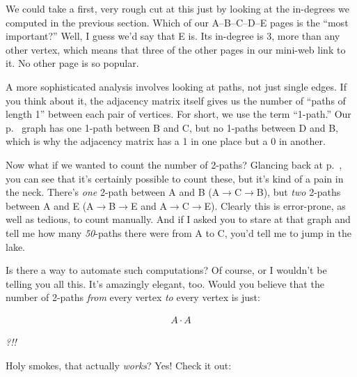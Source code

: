 \begin{alttitles}
We could take a first, very rough cut at this just by looking at the in-degrees
we computed in the previous section. Which of our A--B--C--D--E pages is the
``most important?'' Well, I guess we'd say that E is. Its in-degree is 3, more
than any other vertex, which means that three of the other pages in our
mini-web link to it. No other page is so popular.


A more sophisticated analysis involves looking at paths, not just single edges.
If you think about it, the adjacency matrix itself gives us the number of
``paths of length 1'' between each pair of vertices. For short, we use the term
``1-path.'' Our p.~\pageref{fig:directedGraph} graph has one 1-path between B
and C, but no 1-paths between D and B, which is why the adjacency matrix has a
1 in one place but a 0 in another.

Now what if we wanted to count the number of 2-paths? Glancing back at
p.~\pageref{fig:directedGraph}, you can see that it's certainly possible to
count these, but it's kind of a pain in the neck. There's \textit{one} 2-path
between A and B (A$\rightarrow$C$\rightarrow$B), but \textit{two} 2-paths
between A and E (A$\rightarrow$B$\rightarrow$E and
A$\rightarrow$C$\rightarrow$E). Clearly this is error-prone, as well as
tedious, to count manually. And if I asked you to stare at that graph and tell
me how many \textit{50}-paths there were from A to C, you'd tell me to jump in
the lake.

Is there a way to automate such computations? Of course, or I wouldn't be
telling you all this. It's amazingly elegant, too. Would you believe that the
number of 2-paths \textit{from} every vertex \textit{to} every vertex is just:

\vspace{-.15in}
\begin{align*}
A \cdot A
\end{align*}
\vspace{-.25in}

\textit{?!!}

\smallskip
Holy smokes, that actually \textit{works}? Yes! Check it out:


\end{alttitles}
